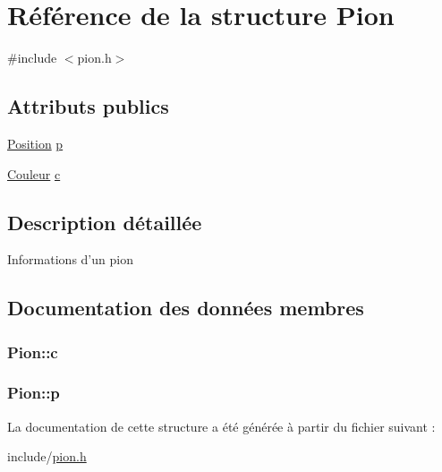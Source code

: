 \hypertarget{structPion}{\section{\-Référence de la structure \-Pion}
\label{structPion}
}


{\ttfamily \#include $<$pion.\-h$>$}

\subsection*{\-Attributs publics}
\begin{DoxyCompactItemize}
\item 
\hyperlink{structPosition}{\-Position} \hyperlink{structPion_a1a131c2aae6a64827c7fcd6f52fcb47c}{p}
\item 
\hyperlink{couleur_8h_ae253e1bdbff71a044d939ee96ba0814a}{\-Couleur} \hyperlink{structPion_a3811851abd3312e2e60a78fbc75081cb}{c}
\end{DoxyCompactItemize}


\subsection{\-Description détaillée}
\-Informations d'un pion 

\subsection{\-Documentation des données membres}
\hypertarget{structPion_a3811851abd3312e2e60a78fbc75081cb}{
\subsubsection[{c}]{ {\bf \-Pion\-::c}}}\label{structPion_a3811851abd3312e2e60a78fbc75081cb}
\hypertarget{structPion_a1a131c2aae6a64827c7fcd6f52fcb47c}{
\subsubsection[{p}]{ {\bf \-Pion\-::p}}}\label{structPion_a1a131c2aae6a64827c7fcd6f52fcb47c}


\-La documentation de cette structure a été générée à partir du fichier suivant \-:\begin{DoxyCompactItemize}
\item 
include/\hyperlink{pion_8h}{pion.\-h}\end{DoxyCompactItemize}

